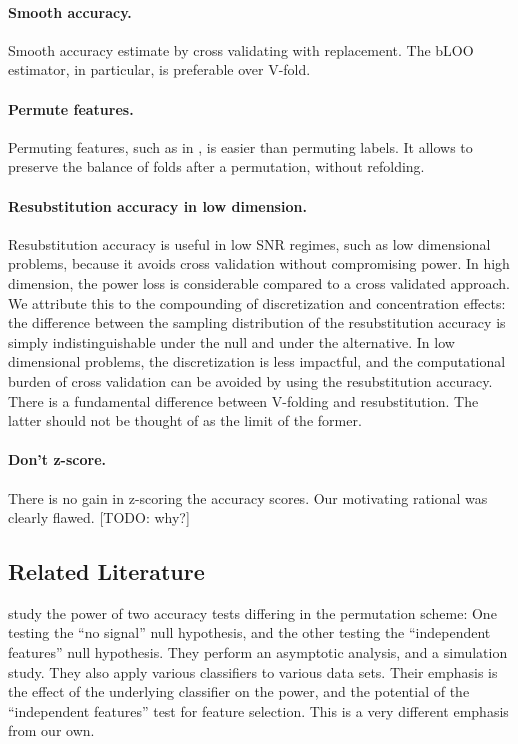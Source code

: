 \documentclass[12pt,a4paper]{article}
\theoremstyle{definition}
\begin{document}
\paragraph{Smooth accuracy.}
Smooth accuracy estimate by cross validating with replacement. The bLOO estimator, in particular, is preferable over V-fold.

\paragraph{Permute features.} Permuting features, such as in \cite{golland_permutation_2005}, is easier than permuting labels. 
It allows to preserve the balance of folds after a permutation, without refolding.

\paragraph{Resubstitution accuracy in low dimension.} Resubstitution accuracy is useful in low SNR regimes, such as low dimensional problems, because it avoids cross validation without compromising power. 
In high dimension, the power loss is considerable compared to a cross validated approach. 
We attribute this to the compounding of discretization and concentration effects: the difference between the sampling distribution of the resubstitution accuracy is simply indistinguishable under the null and under the alternative. 
In low dimensional problems, the discretization is less impactful, and the computational burden of cross validation can be avoided by using the resubstitution accuracy. 
There is a fundamental difference between V-folding and resubstitution. The latter should not be thought of as the limit of the former. 
 

\paragraph{Don't z-score.} There is no gain in z-scoring the accuracy scores. Our motivating rational was clearly flawed. [TODO: why?]

















\subsection{Related Literature}
\cite{ojala_permutation_2010} study the power of two accuracy tests differing in the permutation scheme:
One testing the ``no signal'' null hypothesis, and the other testing the ``independent features'' null hypothesis. 
They perform an asymptotic analysis, and a simulation study. 
They also apply various classifiers to various data sets. 
Their emphasis is the effect of the underlying classifier on the power, and the potential of the ``independent features'' test for feature selection.
This is a very different emphasis from our own.
\end{document}
